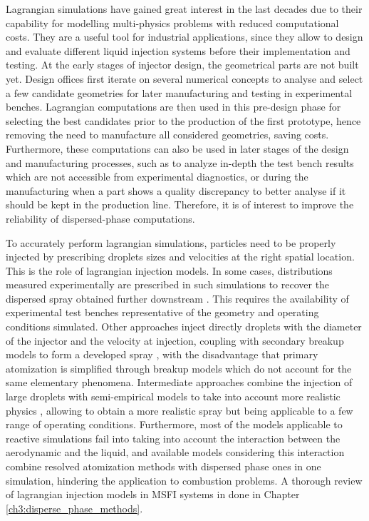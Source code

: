 
Lagrangian simulations have gained great interest in the last decades due to their capability for modelling multi-physics problems with reduced computational costs. They are a useful tool for industrial applications, since they allow to design and evaluate different liquid injection systems before their implementation and testing. At the early stages of injector design, the geometrical parts are not built yet. Design offices first iterate on several numerical concepts to analyse and select a few candidate geometries for later manufacturing and testing in experimental benches. Lagrangian computations are then used in this pre-design phase for selecting the best candidates prior to the production of the first prototype, hence removing the need to manufacture all considered geometries, saving costs. Furthermore, these computations can also be used in later stages of the design and manufacturing processes, such as to analyze in-depth the test bench results which are not accessible from experimental diagnostics, or during the manufacturing when a part shows a quality discrepancy to better analyse if it should be kept in the production line. Therefore, it is of interest to improve the reliability of dispersed-phase computations.

To accurately perform lagrangian simulations, particles need to be properly injected by prescribing droplets sizes and velocities at the right spatial location. This is the role of lagrangian injection models. In some cases, distributions measured experimentally are prescribed in such simulations to recover the dispersed spray obtained further downstream . This requires the availability of experimental test benches representative of the geometry and operating conditions simulated. Other approaches inject directly droplets with the diameter of the injector and the velocity at injection, coupling with secondary breakup models to form a developed spray , with the disadvantage that primary atomization is simplified through breakup models which do not account for the same elementary phenomena. Intermediate approaches combine the injection of large droplets with semi-empirical models to take into account more realistic physics , allowing to obtain a more realistic spray but being applicable to a few range of operating conditions. Furthermore, most of the models applicable to reactive simulations fail into taking into account the interaction between the aerodynamic and the liquid, and available models considering this interaction  combine resolved atomization methods with dispersed phase ones in one simulation, hindering the application to combustion problems. A thorough review of lagrangian injection models in MSFI systems in done in Chapter \ref{ch3:disperse_phase_methods}.

